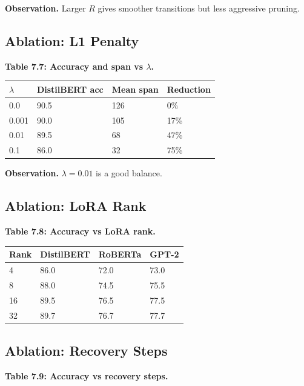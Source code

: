 \textbf{Observation.} Larger $R$ gives smoother transitions but less aggressive 
pruning.

\subsection{Ablation: L1 Penalty}

\textbf{Table 7.7: Accuracy and span vs $\lambda$.}

\begin{table}[H]
\centering
\small
\begin{tabular}{llll}
\toprule
\textbf{$\lambda$} & \textbf{DistilBERT acc} & \textbf{Mean span} & \textbf{Reduction} \\
\midrule
0.0 & 90.5 & 126 & 0\% \\
0.001 & 90.0 & 105 & 17\% \\
0.01 & 89.5 & 68 & 47\% \\
0.1 & 86.0 & 32 & 75\% \\
\bottomrule
\end{tabular}
\end{table}

\textbf{Observation.} $\lambda = 0.01$ is a good balance.

\subsection{Ablation: LoRA Rank}

\textbf{Table 7.8: Accuracy vs LoRA rank.}

\begin{table}[H]
\centering
\small
\begin{tabular}{llll}
\toprule
\textbf{Rank} & \textbf{DistilBERT} & \textbf{RoBERTa} & \textbf{GPT-2} \\
\midrule
4 & 86.0 & 72.0 & 73.0 \\
8 & 88.0 & 74.5 & 75.5 \\
16 & 89.5 & 76.5 & 77.5 \\
32 & 89.7 & 76.7 & 77.7 \\
\bottomrule
\end{tabular}
\end{table}

\subsection{Ablation: Recovery Steps}

\textbf{Table 7.9: Accuracy vs recovery steps.}

